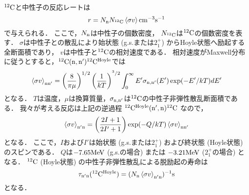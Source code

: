 \documentclass[../master]{subfiles}
\begin{document}
${}^{12}{\rm C}$と中性子の反応レートは
\begin{equation}
  r = N_{\rm n}N_{{}^{12}{\rm C}}\braket{\sigma v} {\rm cm}^{-3}{\rm s}^{-1}
  \label{eq::r}
\end{equation}
で与えられる．
ここで，$N_{{\rm n}}$は中性子の個数密度，
$N_{{}^{12}{\rm C}}$は${}^{12}{\rm C}$の個数密度を表す．
$\sigma$は中性子との散乱により始状態 (g.s.または$2_{1}^{+}$) からHoyle状態へ励起する全断面積であり，
$v$は中性子と${}^{12}{\rm C}$の相対速度である．
相対速度がMaxwell分布に従うとすると，${}^{12}{\rm C}({\rm n},{\rm n'}){}^{12}{\rm C}^{{\rm Hoyle}}$では
\begin{equation}
  \braket{\sigma v}_{\rm nn'} =
  \left(\frac{8}{\pi\mu}\right)^{1/2}\left(\frac{1}{kT}\right)^{^3/2}
  \int^{\infty}_{0}E'\sigma_{\rm n,n'}(E')\exp(-E'/kT)dE'
  \label{eq::sigmann'}
\end{equation}
となる．
$T$は温度，$\mu$は換算質量，$\sigma_{\rm n,n'}$は${}^{12}{\rm C}$の中性子非弾性散乱断面積である．
我々が考える反応は上記の逆過程 ${}^{12}{\rm C}^{{\rm Hoyle}}({\rm n',n}){}^{12}{\rm C}$ なので，
\begin{equation}
  \braket{\sigma v}_{\rm n'n} = \left(\frac{2I+1}{2I'+1}\right)
  \exp(-Q/kT)\braket{\sigma v}_{\rm nn'}
  \label{eq::sigman'n}
\end{equation}
となる．
ここで，$I$および$I'$は始状態 (g.s.または$2_{1}^{+}$)
および終状態 (Hoyle状態) のスピンである．
$Q$は$-7.65{\rm MeV}$ (g.s.の場合) または
$-3.21{\rm MeV}$ ($2_{1}^{+}$の場合) となる．
${}^{12}{\rm C}$ (Hoyle状態) の中性子非弾性散乱による脱励起の寿命は
\begin{equation}
  \tau_{\rm n'n}({}^{12}{\rm C}^{{\rm Hoyle}}) =
  (N_{\rm n}\braket{\sigma v}_{\rm n'n})^{-1} {\rm s}
  \label{eq::tau}
\end{equation}
となる．
\end{document}

